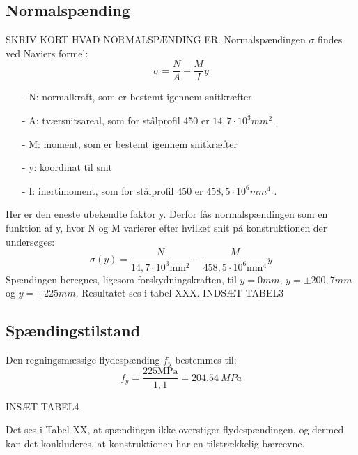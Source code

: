 \subsection{Normalspænding}
SKRIV KORT HVAD NORMALSPÆNDING ER.
\newline
Normalspændingen $\sigma$ findes ved Naviers formel:
\begin{equation}
\sigma = \frac{N}{A} - \frac{M}{I} y
\end{equation}

\begin{itemize}
	\item[-] N: normalkraft, som er bestemt igennem snitkræfter
	\item[-] A: tværsnitsareal, som for stålprofil 450 er $14,\!7 \cdot 10^3 mm^2$ \citep{stabi}. 
	\item[-] M: moment, som er bestemt igennem snitkræfter
	\item[-] y: koordinat til snit
	\item[-] I: inertimoment, som for stålprofil 450 er $458,\!5 \cdot 10^6 mm^4$ \citep{stabi}. 
\end{itemize} 

Her er den eneste ubekendte faktor y. Derfor fås normalspændingen som en funktion af y, hvor N og M varierer efter hvilket snit på konstruktionen der undersøges:
\begin{equation}
	\sigma(y) = \frac{N}{14,\!7 \cdot 10^3 \text{mm}^2} - \frac{M}{458,\!5 \cdot 10^6 \text{mm}^4} y
\end{equation}
Spændingen beregnes, ligesom forskydningskraften, til $y = 0 mm$, $y = \pm 200,\!7 mm$ og $y = \pm 225 mm$. Resultatet ses i tabel XXX. 
\newline
\newline
INDSÆT TABEL3

\subsection{Spændingstilstand}
Den regningsmæssige flydespænding $f_y$ bestemmes til:
\begin{equation}
f_y = \frac{225 \text{MPa}}{1,\!1} = \SI{204,54}{MPa}
\end{equation}

INSÆT TABEL4

Det ses i Tabel XX, at spændingen ikke overstiger flydespændingen, og dermed kan det konkluderes, at konstruktionen har en tilstrækkelig bæreevne. 



